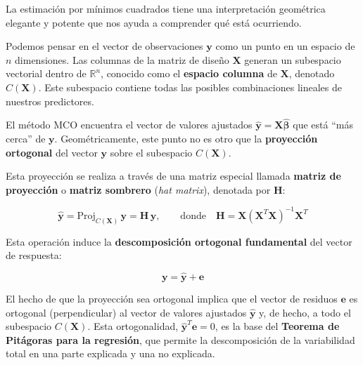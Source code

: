 \documentclass[
  letterpaper,
  DIV=11,
  numbers=noendperiod]{scrreprt}
\begin{document}
\begin{tcolorbox}[enhanced jigsaw, leftrule=.75mm, breakable, colbacktitle=quarto-callout-note-color!10!white, bottomrule=.15mm, colframe=quarto-callout-note-color-frame, toprule=.15mm, colback=white, coltitle=black, bottomtitle=1mm, left=2mm, title=\textcolor{quarto-callout-note-color}{\faInfo}\hspace{0.5em}{La perspectiva geométrica de mínimos cuadrados}, opacityback=0, arc=.35mm, opacitybacktitle=0.6, toptitle=1mm, titlerule=0mm, rightrule=.15mm]

La estimación por mínimos cuadrados tiene una interpretación geométrica
elegante y potente que nos ayuda a comprender qué está ocurriendo.

Podemos pensar en el vector de observaciones \(\mathbf{y}\) como un
punto en un espacio de \(n\) dimensiones. Las columnas de la matriz de
diseño \(\mathbf{X}\) generan un subespacio vectorial dentro de
\(\mathbb{R}^n\), conocido como el \textbf{espacio columna} de
\(\mathbf{X}\), denotado \(C(\mathbf{X})\). Este subespacio contiene
todas las posibles combinaciones lineales de nuestros predictores.

El método MCO encuentra el vector de valores ajustados
\(\hat{\mathbf{y}} = \mathbf{X}\hat{\boldsymbol{\beta}}\) que está ``más
cerca'' de \(\mathbf{y}\). Geométricamente, este punto no es otro que la
\textbf{proyección ortogonal} del vector \(\mathbf{y}\) sobre el
subespacio \(C(\mathbf{X})\).

Esta proyección se realiza a través de una matriz especial llamada
\textbf{matriz de proyección} o \textbf{matriz sombrero} (\emph{hat
matrix}), denotada por \(\mathbf{H}\):

\[\hat{\mathbf{y}} = \text{Proj}_{C(\mathbf{X})}\,\mathbf{y} = \mathbf{H}\,\mathbf{y}, \qquad \text{donde} \quad \mathbf{H} = \mathbf{X}(\mathbf{X}^T\mathbf{X})^{-1}\mathbf{X}^T\]

Esta operación induce la \textbf{descomposición ortogonal fundamental}
del vector de respuesta:

\[\mathbf{y} = \hat{\mathbf{y}} + \mathbf{e}\]

El hecho de que la proyección sea ortogonal implica que el vector de
residuos \(\mathbf{e}\) es ortogonal (perpendicular) al vector de
valores ajustados \(\hat{\mathbf{y}}\) y, de hecho, a todo el subespacio
\(C(\mathbf{X})\). Esta ortogonalidad,
\(\hat{\mathbf{y}}^T\mathbf{e}=0\), es la base del \textbf{Teorema de
Pitágoras para la regresión}, que permite la descomposición de la
variabilidad total en una parte explicada y una no explicada.

\end{tcolorbox}
\end{document}
